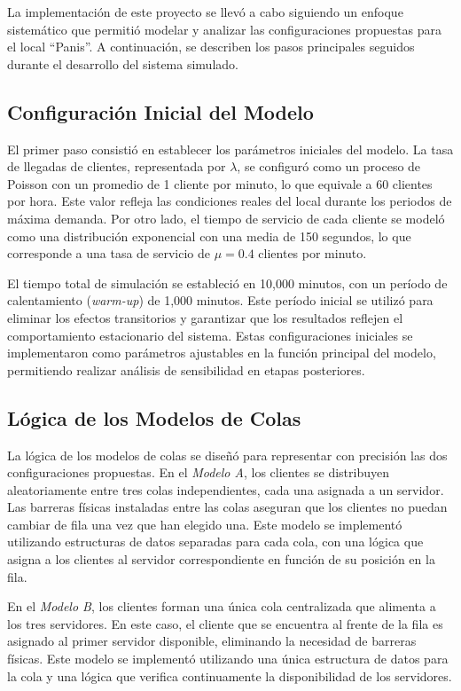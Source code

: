 \documentclass[a4paper,12pt]{article}
\begin{document}
La implementación de este proyecto se llevó a cabo siguiendo un enfoque sistemático que permitió modelar y analizar las configuraciones propuestas para el local “Panis”. A continuación, se describen los pasos principales seguidos durante el desarrollo del sistema simulado.

\subsection{Configuración Inicial del Modelo}

El primer paso consistió en establecer los parámetros iniciales del modelo. La tasa de llegadas de clientes, representada por $\lambda$, se configuró como un proceso de Poisson con un promedio de 1 cliente por minuto, lo que equivale a 60 clientes por hora. Este valor refleja las condiciones reales del local durante los periodos de máxima demanda. Por otro lado, el tiempo de servicio de cada cliente se modeló como una distribución exponencial con una media de 150 segundos, lo que corresponde a una tasa de servicio de $\mu = 0.4$ clientes por minuto. 

El tiempo total de simulación se estableció en 10,000 minutos, con un período de calentamiento (\textit{warm-up}) de 1,000 minutos. Este período inicial se utilizó para eliminar los efectos transitorios y garantizar que los resultados reflejen el comportamiento estacionario del sistema. Estas configuraciones iniciales se implementaron como parámetros ajustables en la función principal del modelo, permitiendo realizar análisis de sensibilidad en etapas posteriores.

\subsection{Lógica de los Modelos de Colas}

La lógica de los modelos de colas se diseñó para representar con precisión las dos configuraciones propuestas. En el \textit{Modelo A}, los clientes se distribuyen aleatoriamente entre tres colas independientes, cada una asignada a un servidor. Las barreras físicas instaladas entre las colas aseguran que los clientes no puedan cambiar de fila una vez que han elegido una. Este modelo se implementó utilizando estructuras de datos separadas para cada cola, con una lógica que asigna a los clientes al servidor correspondiente en función de su posición en la fila.

En el \textit{Modelo B}, los clientes forman una única cola centralizada que alimenta a los tres servidores. En este caso, el cliente que se encuentra al frente de la fila es asignado al primer servidor disponible, eliminando la necesidad de barreras físicas. Este modelo se implementó utilizando una única estructura de datos para la cola y una lógica que verifica continuamente la disponibilidad de los servidores.
\end{document}
